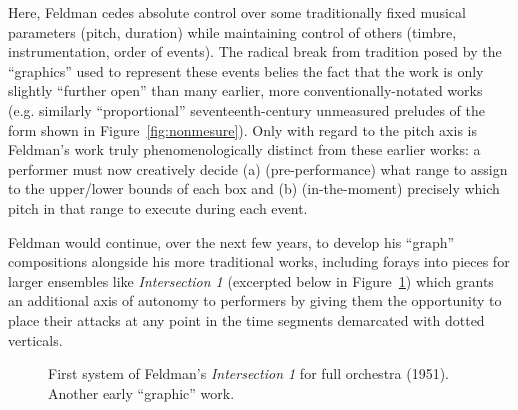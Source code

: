     Here, Feldman cedes absolute control over some traditionally fixed musical parameters (pitch, duration) while maintaining control of others (timbre, instrumentation, order of events). The radical break from tradition posed by the ``graphics'' used to represent these events belies the fact that the work is only slightly ``further open'' than many earlier, more conventionally-notated works (e.g. similarly ``proportional'' seventeenth-century unmeasured preludes of the form shown in Figure~\ref{fig:nonmesure}). Only with regard to the pitch axis is Feldman's work truly phenomenologically distinct from these earlier works: a performer must now creatively decide (a) (pre-performance) what range to assign to the upper/lower bounds of each box and (b) (in-the-moment) precisely which pitch in that range to execute during each event.

    Feldman would continue, over the next few years, to develop his ``graph'' compositions alongside his more traditional works, including forays into pieces for larger ensembles like \textit{Intersection 1} (excerpted below in Figure~\ref{fig:feldman2}) which grants an additional axis of autonomy to performers by giving them the opportunity to place their attacks at any point in the time segments demarcated with dotted verticals.

        \begin{figure}
            \centering
            \captionsetup{width=.5\textwidth}
            \caption[First system of Feldman's \textit{Intersection 1} for full orchestra (1951). Another early ``graphic'' work.]{First system of Feldman's \textit{Intersection 1} for full orchestra (1951). Another early ``graphic'' work.\footnotemark}
            \label{fig:feldman2}
        \end{figure}

